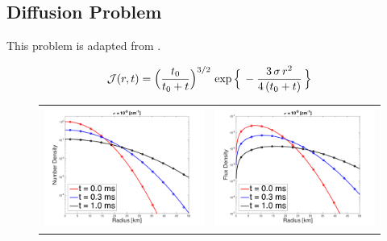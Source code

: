 \documentclass[10pt,preprint]{aastex}
\begin{document}
\subsection{Diffusion Problem}

This problem is adapted from \citet{abdikamalov_etal_2012} \citep[see also][]{pons_etal_2000,sumiyoshiYamada_2012}.  

\begin{equation}
  \mathcal{J}(r,t)=\Big(\frac{t_{0}}{t_{0}+t}\Big)^{3/2}\,\exp\Big\{\,-\frac{3\,\sigma\,r^{2}}{4\,(t_{0}+t)}\,\Big\}
\end{equation}

\begin{figure}
  \begin{center}
    \begin{tabular}{cc}
      \includegraphics[scale=0.38]{./Figures/GaussianSphericalDiffusion_Kappa_1e-5_Density} &
      \includegraphics[scale=0.38]{./Figures/GaussianSphericalDiffusion_Kappa_1e-5_Flux}

\end{tabular}
\end{center}
\end{figure}
\end{document}
